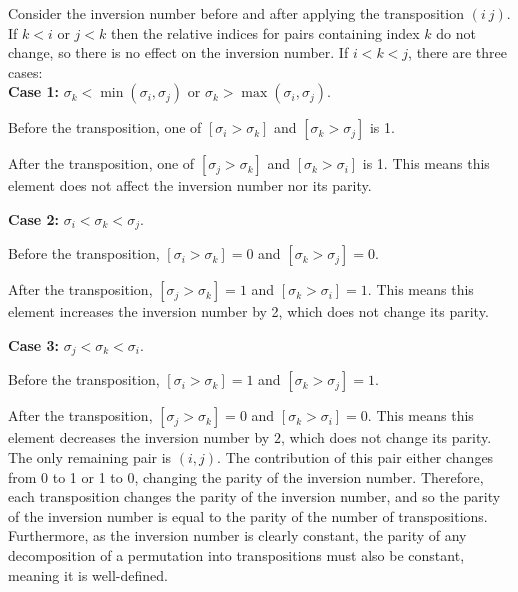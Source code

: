 \documentclass{article}
\begin{document}
    Consider the inversion number before and after applying the transposition $(i\ j)$. If $k < i$ or $j < k$ then the relative indices for pairs containing index $k$ do not change, so there is no effect on the inversion number. If $i < k < j$, there are three cases: \\

    \textbf{Case 1:} $\sigma_k < \min(\sigma_i, \sigma_j)$ or $\sigma_k > \max(\sigma_i, \sigma_j)$. 
    
    Before the transposition, one of $[\sigma_i > \sigma_k]$ and $[\sigma_k > \sigma_j]$ is 1.
    
    After the transposition, one of $[\sigma_j > \sigma_k]$ and $[\sigma_k > \sigma_i]$ is 1. This means this element does not affect the inversion number nor its parity.

    \textbf{Case 2:} $\sigma_i < \sigma_k < \sigma_j$.
    
    Before the transposition, $[\sigma_i > \sigma_k] = 0$ and $[\sigma_k > \sigma_j] = 0$. 
    
    After the transposition, $[\sigma_j > \sigma_k] = 1$ and $[\sigma_k > \sigma_i] = 1$. This means this element increases the inversion number by 2, which does not change its parity.

    \textbf{Case 3:} $\sigma_j < \sigma_k < \sigma_i$.

    Before the transposition, $[\sigma_i > \sigma_k] = 1$ and $[\sigma_k > \sigma_j] = 1$. 
    
    After the transposition, $[\sigma_j > \sigma_k] = 0$ and $[\sigma_k > \sigma_i] = 0$. This means this element decreases the inversion number by $2$, which does not change its parity. \\

    The only remaining pair is $(i, j)$. The contribution of this pair either changes from 0 to 1 or 1 to 0, changing the parity of the inversion number. Therefore, each transposition changes the parity of the inversion number, and so the parity of the inversion number is equal to the parity of the number of transpositions. Furthermore, as the inversion number is clearly constant, the parity of any decomposition of a permutation into transpositions must also be constant, meaning it is well-defined. \\
\end{document}
